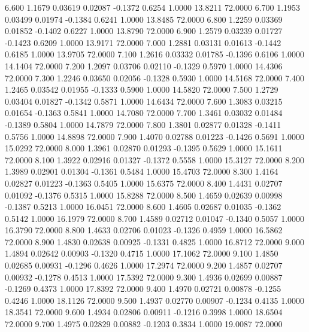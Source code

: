    6.600   1.1679   0.03619   0.02087  -0.1372   0.6254   1.0000  13.8211  72.0000
   6.700   1.1953   0.03499   0.01974  -0.1384   0.6241   1.0000  13.8485  72.0000
   6.800   1.2259   0.03369   0.01852  -0.1402   0.6227   1.0000  13.8790  72.0000
   6.900   1.2579   0.03239   0.01727  -0.1423   0.6209   1.0000  13.9171  72.0000
   7.000   1.2881   0.03131   0.01613  -0.1442   0.6185   1.0000  13.9705  72.0000
   7.100   1.2616   0.03332   0.01785  -0.1396   0.6106   1.0000  14.1404  72.0000
   7.200   1.2097   0.03706   0.02110  -0.1329   0.5970   1.0000  14.4306  72.0000
   7.300   1.2246   0.03650   0.02056  -0.1328   0.5930   1.0000  14.5168  72.0000
   7.400   1.2465   0.03542   0.01955  -0.1333   0.5900   1.0000  14.5820  72.0000
   7.500   1.2729   0.03404   0.01827  -0.1342   0.5871   1.0000  14.6434  72.0000
   7.600   1.3083   0.03215   0.01654  -0.1363   0.5841   1.0000  14.7080  72.0000
   7.700   1.3461   0.03032   0.01484  -0.1389   0.5804   1.0000  14.7879  72.0000
   7.800   1.3801   0.02877   0.01328  -0.1411   0.5756   1.0000  14.8898  72.0000
   7.900   1.4070   0.02788   0.01223  -0.1426   0.5691   1.0000  15.0292  72.0000
   8.000   1.3961   0.02870   0.01293  -0.1395   0.5629   1.0000  15.1611  72.0000
   8.100   1.3922   0.02916   0.01327  -0.1372   0.5558   1.0000  15.3127  72.0000
   8.200   1.3989   0.02901   0.01304  -0.1361   0.5484   1.0000  15.4703  72.0000
   8.300   1.4164   0.02827   0.01223  -0.1363   0.5405   1.0000  15.6375  72.0000
   8.400   1.4431   0.02707   0.01092  -0.1376   0.5315   1.0000  15.8288  72.0000
   8.500   1.4659   0.02639   0.00998  -0.1387   0.5213   1.0000  16.0451  72.0000
   8.600   1.4605   0.02687   0.01035  -0.1362   0.5142   1.0000  16.1979  72.0000
   8.700   1.4589   0.02712   0.01047  -0.1340   0.5057   1.0000  16.3790  72.0000
   8.800   1.4633   0.02706   0.01023  -0.1326   0.4959   1.0000  16.5862  72.0000
   8.900   1.4830   0.02638   0.00925  -0.1331   0.4825   1.0000  16.8712  72.0000
   9.000   1.4894   0.02642   0.00903  -0.1320   0.4715   1.0000  17.1062  72.0000
   9.100   1.4850   0.02685   0.00931  -0.1296   0.4626   1.0000  17.2974  72.0000
   9.200   1.4857   0.02707   0.00932  -0.1278   0.4513   1.0000  17.5392  72.0000
   9.300   1.4936   0.02699   0.00887  -0.1269   0.4373   1.0000  17.8392  72.0000
   9.400   1.4970   0.02721   0.00878  -0.1255   0.4246   1.0000  18.1126  72.0000
   9.500   1.4937   0.02770   0.00907  -0.1234   0.4135   1.0000  18.3541  72.0000
   9.600   1.4934   0.02806   0.00911  -0.1216   0.3998   1.0000  18.6504  72.0000
   9.700   1.4975   0.02829   0.00882  -0.1203   0.3834   1.0000  19.0087  72.0000

